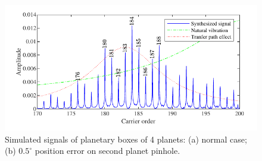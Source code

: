 \documentclass[a4paper,fleqn]{cas-sc}%
\begin{document}
\begin{figure}[pos=htbp]
    \hspace*{1.5em}\includegraphics[scale=\myscale,valign=t]{Freq_p4_fault.pdf}
    \caption{Simulated signals of planetary boxes of 4 planets: (a) normal case; (b) $0.5^\circ$ position error on second planet pinhole.}
    \label{fig:simulated_p4}
\end{figure}
\end{document}
